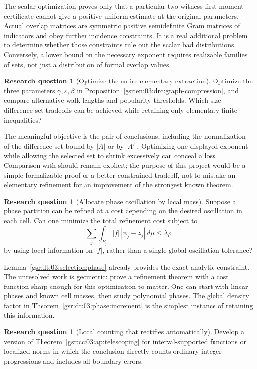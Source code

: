 \documentclass[11pt,letterpaper]{article}
\numberwithin{equation}{section}
\theoremstyle{definition}
\newtheorem{problem}[theorem]{Research question}
\theoremstyle{remark}
\newcommand{\1}{\mathbf 1}
\begin{document}
The scalar optimization proves only that a particular two-witness
first-moment certificate cannot give a positive uniform estimate at the
original parameters. Actual overlap matrices are symmetric positive
semidefinite Gram matrices of indicators and obey further incidence
constraints. It is a real additional problem to determine whether those
constraints rule out the scalar bad distributions. Conversely, a lower
bound on the necessary exponent requires realizable families of sets,
not just a distribution of formal overlap values.

\begin{problem}[Optimize the entire elementary extraction]
Optimize the three parameters $\gamma,\varepsilon,\beta$ in
Proposition~\ref{gsr:en:03:drc:graph-compression}, and compare alternative walk
lengths and popularity thresholds. Which size--difference-set tradeoffs
can be achieved while retaining only elementary finite inequalities?
\end{problem}

The meaningful objective is the pair of conclusions, including the
normalization of the difference-set bound by $|A|$ or by $|A'|$.
Optimizing one displayed exponent while allowing the selected set to
shrink excessively can conceal a loss. Comparison with
\cite{reiherschoen} should remain explicit; the purpose of this project
would be a simple formalizable proof or a better constrained tradeoff,
not to mistake an elementary refinement for an improvement of the
strongest known theorem.

\begin{problem}[Allocate phase oscillation by local mass]
Suppose a phase partition can be refined at a cost depending on the
desired oscillation in each cell. Can one minimize the total refinement
cost subject to
\[
 \sum_j\int_{P_j}|f|\,|\psi_j-z_j|\,d\mu\le\lambda\rho
\]
by using local information on $|f|$, rather than a single global
oscillation tolerance?
\end{problem}

Lemma~\ref{gsr:dt:03:selection:phase} already provides the exact analytic constraint.
The unresolved work is geometric: prove a refinement theorem with a
cost function sharp enough for this optimization to matter. One can
start with linear phases and known cell masses, then study polynomial
phases. The global density factor in Theorem~\ref{gsr:dt:03:phase:increment} is
the simplest instance of retaining this information.

\begin{problem}[Local counting that rectifies automatically]
Develop a version of Theorem~\ref{gsr:cc:03:ap:telescoping} for interval-supported
functions or localized norms in which the conclusion directly counts
ordinary integer progressions and includes all boundary errors.
\end{problem}
\end{document}
